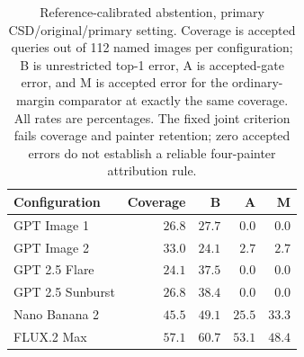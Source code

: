 \begin{table}[!htbp]
\caption{Reference-calibrated abstention, primary CSD/original/primary setting. Coverage is accepted queries out of 112 named images per configuration; B is unrestricted top-1 error, A is accepted-gate error, and M is accepted error for the ordinary-margin comparator at exactly the same coverage. All rates are percentages. The fixed joint criterion fails coverage and painter retention; zero accepted errors do not establish a reliable four-painter attribution rule.}
\label{tab:selective-main}
\centering\footnotesize\setlength{\tabcolsep}{3pt}
\begin{tabularx}{\linewidth}{@{}Xrrrr@{}}\toprule
Configuration & Coverage & B & A & M\\\midrule
GPT Image 1 & $26.8$ & $27.7$ & $0.0$ & $0.0$\\
GPT Image 2 & $33.0$ & $24.1$ & $2.7$ & $2.7$\\
GPT 2.5 Flare & $24.1$ & $37.5$ & $0.0$ & $0.0$\\
GPT 2.5 Sunburst & $26.8$ & $38.4$ & $0.0$ & $0.0$\\
Nano Banana 2 & $45.5$ & $49.1$ & $25.5$ & $33.3$\\
FLUX.2 Max & $57.1$ & $60.7$ & $53.1$ & $48.4$\\
\bottomrule\end{tabularx}
\end{table}
